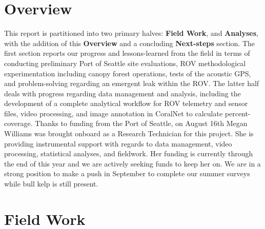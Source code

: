 \documentclass[11pt]{article}
\begin{document}
\section{Overview}
\label{Overview}
This report is partitioned into two primary halves: \textbf{Field 
Work}, and \textbf{Analyses}, with the addition of this 
\textbf{Overview} and a concluding \textbf{Next-steps} section.  
The first section reports our progress and lessons-learned from 
the field in terms of conducting preliminary Port of Seattle site 
evaluations, ROV methodological experimentation including canopy forest 
operations, tests of the acoustic GPS, and problem-solving regarding an 
emergent leak within the ROV. 
The latter half deals with progress regarding data management and 
analysis, including the development of a complete analytical workflow 
for ROV telemetry and sensor files, video processing, and image 
annotation in CoralNet to calculate percent-coverage.  
Thanks to funding from the Port of Seattle, on August 16th Megan 
Williams was brought onboard as a Research Technician for this project. 
She is providing instrumental support with regards to data management, 
video processing, statistical analyses, and fieldwork. 
Her funding is currently through the end of this year and we are 
actively seeking funds to keep her on.  
We are in a strong position to make a push in September to complete our 
summer surveys while bull kelp is still present.




\section{Field Work}
\label{Field Work}
\end{document}
